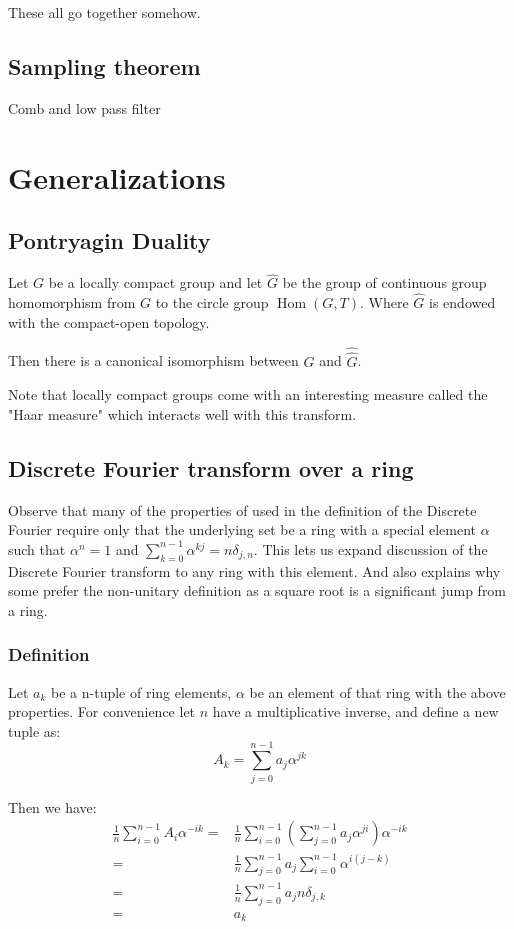\documentclass[12pt]{report}
\DeclareMathOperator{\Hom}{Hom}
\begin{document}
These all go together somehow.
\section{Sampling theorem}
Comb and low pass filter

\chapter{Generalizations}
\section{Pontryagin Duality}
Let $G$ be a locally compact group and let $\hat{G}$ be the group of continuous group homomorphism from $G$ to the circle group $\Hom(G,T)$. Where $\hat{G}$ is endowed with the compact-open topology.

Then there is a canonical isomorphism between $G$ and $\hat{\hat{G}}$.

Note that locally compact groups come with an interesting measure called the "Haar measure" which interacts well with this transform.

\section{Discrete Fourier transform over a ring}
\label{sec:ring}
Observe that many of the properties of used in the definition of the Discrete Fourier require only that the underlying set be a ring with a special element $\alpha$ such that $\alpha^n = 1$ and $\sum_{k=0}^{n-1}\alpha^{kj} = n\delta_{j,n}$.
This lets us expand discussion of the Discrete Fourier transform to any ring with this element.
And also explains why some prefer the non-unitary definition as a square root is a significant jump from a ring.

\subsection{Definition}
Let $a_k$ be a n-tuple of ring elements, $\alpha$ be an element of that ring with the above properties. 
For convenience let $n$ have a multiplicative inverse, and define a new tuple as:
\[A_k = \sum_{j=0}^{n-1}a_j\alpha^{jk}\]

Then we have:
\begin{equation*}
\begin{aligned}
	\frac{1}{n}\sum_{i=0}^{n-1}A_i\alpha^{-ik} =& 
	\frac{1}{n}\sum_{i=0}^{n-1}\left(\sum_{j=0}^{n-1}a_j\alpha^{ji}\right)\alpha^{-ik} \\ 
	=&\frac{1}{n}\sum_{j=0}^{n-1}a_j\sum_{i=0}^{n-1}\alpha^{i(j-k)} \\ 
	=&\frac{1}{n}\sum_{j=0}^{n-1}a_jn\delta_{j,k} \\ 
	=&a_k \\ 
\end{aligned}
\end{equation*}
\end{document}
